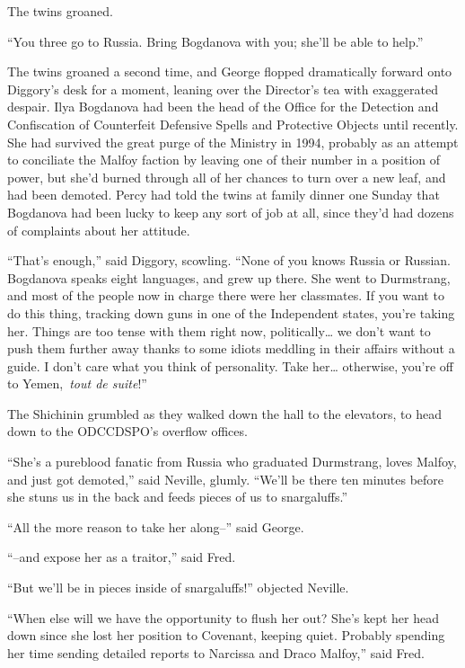 The twins groaned.

``You three go to Russia. Bring Bogdanova with you; she'll be able to
help.''

The twins groaned a second time, and George flopped dramatically forward
onto Diggory's desk for a moment, leaning over the Director's tea with
exaggerated despair. Ilya Bogdanova had been the head of the Office for
the Detection and Confiscation of Counterfeit Defensive Spells and
Protective Objects until recently. She had survived the great purge of
the Ministry in 1994, probably as an attempt to conciliate the Malfoy
faction by leaving one of their number in a position of power, but she'd
burned through all of her chances to turn over a new leaf, and had been
demoted. Percy had told the twins at family dinner one Sunday that
Bogdanova had been lucky to keep any sort of job at all, since they'd
had dozens of complaints about her attitude.

``That's enough,'' said Diggory, scowling. ``None of you knows Russia or
Russian. Bogdanova speaks eight languages, and grew up there. She went
to Durmstrang, and most of the people now in charge there were her
classmates. If you want to do this thing, tracking down guns in one of
the Independent states, you're taking her. Things are too tense with
them right now, politically\ldots{} we don't want to push them further
away thanks to some idiots meddling in their affairs without a guide. I
don't care what you think of personality. Take her\ldots{} otherwise,
you're off to Yemen,~\emph{tout de suite}!''

The Shichinin grumbled as they walked down the hall to the elevators, to
head down to the ODCCDSPO's overflow offices.

``She's a pureblood fanatic from Russia who graduated Durmstrang, loves
Malfoy, and just got demoted,'' said Neville, glumly. ``We'll be there
ten minutes before she stuns us in the back and feeds pieces of us to
snargaluffs.''

``All the more reason to take her along--'' said George.

``--and expose her as a traitor,'' said Fred.

``But we'll be in pieces inside of snargaluffs!'' objected Neville.

``When else will we have the opportunity to flush her out? She's kept
her head down since she lost her position to Covenant, keeping quiet.
Probably spending her time sending detailed reports to Narcissa and
Draco Malfoy,'' said Fred.

